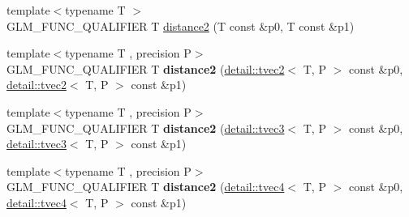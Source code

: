 \begin{DoxyCompactItemize}
\item 
{\footnotesize template$<$typename T $>$ }\\G\-L\-M\-\_\-\-F\-U\-N\-C\-\_\-\-Q\-U\-A\-L\-I\-F\-I\-E\-R T \hyperlink{group__gtx__norm_ga3544f6288d3bce2cf2a9f6ebe39e0557}{distance2} (T const \&p0, T const \&p1)
\item 
\hypertarget{namespaceglm_acd53e249662a44d82b8ec598866aa5b7}{{\footnotesize template$<$typename T , precision P$>$ }\\G\-L\-M\-\_\-\-F\-U\-N\-C\-\_\-\-Q\-U\-A\-L\-I\-F\-I\-E\-R T {\bfseries distance2} (\hyperlink{structglm_1_1detail_1_1tvec2}{detail\-::tvec2}$<$ T, P $>$ const \&p0, \hyperlink{structglm_1_1detail_1_1tvec2}{detail\-::tvec2}$<$ T, P $>$ const \&p1)}\label{namespaceglm_acd53e249662a44d82b8ec598866aa5b7}

\item 
\hypertarget{namespaceglm_a0d982b7f9df34f27a0fd101889deccf9}{{\footnotesize template$<$typename T , precision P$>$ }\\G\-L\-M\-\_\-\-F\-U\-N\-C\-\_\-\-Q\-U\-A\-L\-I\-F\-I\-E\-R T {\bfseries distance2} (\hyperlink{structglm_1_1detail_1_1tvec3}{detail\-::tvec3}$<$ T, P $>$ const \&p0, \hyperlink{structglm_1_1detail_1_1tvec3}{detail\-::tvec3}$<$ T, P $>$ const \&p1)}\label{namespaceglm_a0d982b7f9df34f27a0fd101889deccf9}

\item 
\hypertarget{namespaceglm_a20cbd12ccd2a5306fbdb0542c2700e67}{{\footnotesize template$<$typename T , precision P$>$ }\\G\-L\-M\-\_\-\-F\-U\-N\-C\-\_\-\-Q\-U\-A\-L\-I\-F\-I\-E\-R T {\bfseries distance2} (\hyperlink{structglm_1_1detail_1_1tvec4}{detail\-::tvec4}$<$ T, P $>$ const \&p0, \hyperlink{structglm_1_1detail_1_1tvec4}{detail\-::tvec4}$<$ T, P $>$ const \&p1)}\label{namespaceglm_a20cbd12ccd2a5306fbdb0542c2700e67}


\end{DoxyCompactItemize}
